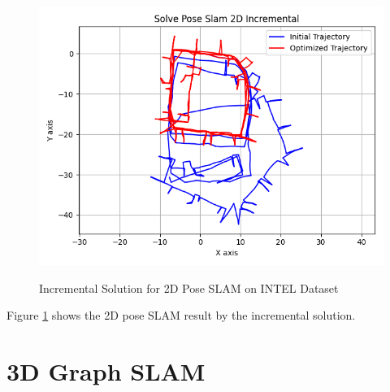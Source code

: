 \documentclass[11pt, oneside, letter]{article}
\begin{document}
\begin{enumerate}[A.]
\begin{figure}[H]
    \centering
        \textsf{\includegraphics[width=0.6\columnwidth]{../figures/solve_pose_slam_2d_incremental.png}}
        \caption{Incremental Solution for 2D Pose SLAM on INTEL Dataset}
        \label{fig:solve_pose_slam_2d_incremental}
\end{figure}

Figure \ref{fig:solve_pose_slam_2d_incremental} shows the 2D pose SLAM result by the incremental solution.

\end{enumerate}




\section{3D Graph SLAM}\label{sec:3d}
\end{document}
